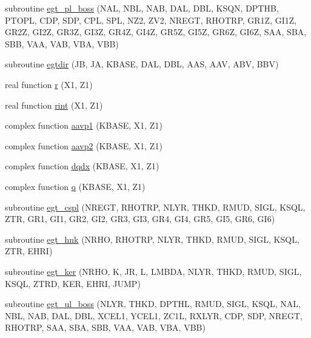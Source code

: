 \begin{DoxyCompactItemize}
\item 
subroutine \hyperlink{Leroi__c_8f90_a7acbe12b71ec5be34d994fc6743480c8}{egt\+\_\+pl\+\_\+boss} (N\+AL, N\+BL, N\+AB, D\+AL, D\+BL, K\+S\+QN, D\+P\+T\+HB, P\+T\+O\+PL, C\+DP, S\+DP, C\+PL, S\+PL, N\+Z2, Z\+V2, N\+R\+E\+GT, R\+H\+O\+T\+RP, G\+R1Z, G\+I1Z, G\+R2Z, G\+I2Z, G\+R3Z, G\+I3Z, G\+R4Z, G\+I4Z, G\+R5Z, G\+I5Z, G\+R6Z, G\+I6Z, S\+AA, S\+BA, S\+BB, V\+AA, V\+AB, V\+BA, V\+BB)
\item 
subroutine \hyperlink{Leroi__c_8f90_a24151574c4bb3d7844db88f91d23b589}{egtdir} (JB, JA, K\+B\+A\+SE, D\+AL, D\+BL, A\+AS, A\+AV, A\+BV, B\+BV)
\item 
real function \hyperlink{Leroi__c_8f90_ab86561ed12c5864e44152801ef93c7c8}{r} (X1, Z1)
\item 
real function \hyperlink{Leroi__c_8f90_a175215729f915283d0b8fb5dec72eb0a}{rint} (X1, Z1)
\item 
complex function \hyperlink{Leroi__c_8f90_a2d69cada9a1fff81caa02d919be5ce7c}{aavp1} (K\+B\+A\+SE, X1, Z1)
\item 
complex function \hyperlink{Leroi__c_8f90_afeabf8ee47c9628f00ed2dfa98f56e40}{aavp2} (K\+B\+A\+SE, X1, Z1)
\item 
complex function \hyperlink{Leroi__c_8f90_a0dd58336077baa8c233cc4d08cc10939}{dqdx} (K\+B\+A\+SE, X1, Z1)
\item 
complex function \hyperlink{Leroi__c_8f90_a3849611a53bff318a7443ebea8b8b480}{q} (K\+B\+A\+SE, X1, Z1)
\item 
subroutine \hyperlink{Leroi__c_8f90_a39b25039701be699f724d2a872d3d3f3}{egt\+\_\+cspl} (N\+R\+E\+GT, R\+H\+O\+T\+RP, N\+L\+YR, T\+H\+KD, R\+M\+UD, S\+I\+GL, K\+S\+QL, Z\+TR, G\+R1, G\+I1, G\+R2, G\+I2, G\+R3, G\+I3, G\+R4, G\+I4, G\+R5, G\+I5, G\+R6, G\+I6)
\item 
subroutine \hyperlink{Leroi__c_8f90_ae50e88569c7037d3d431d0b0dd30c795}{egt\+\_\+hnk} (N\+R\+HO, R\+H\+O\+T\+RP, N\+L\+YR, T\+H\+KD, R\+M\+UD, S\+I\+GL, K\+S\+QL, Z\+TR, E\+H\+RI)
\item 
subroutine \hyperlink{Leroi__c_8f90_ad8346887f578fa81508d64ff7308bd70}{egt\+\_\+ker} (N\+R\+HO, K, JR, L, L\+M\+B\+DA, N\+L\+YR, T\+H\+KD, R\+M\+UD, S\+I\+GL, K\+S\+QL, Z\+T\+RD, K\+ER, E\+H\+RI, J\+U\+MP)
\item 
subroutine \hyperlink{Leroi__c_8f90_a9074cfabdfb82294ca3b8541c14a9099}{egt\+\_\+ul\+\_\+boss} (N\+L\+YR, T\+H\+KD, D\+P\+T\+HL, R\+M\+UD, S\+I\+GL, K\+S\+QL, N\+AL, N\+BL, N\+AB, D\+AL, D\+BL, X\+C\+E\+L1, Y\+C\+E\+L1, Z\+C1L, R\+X\+L\+YR, C\+DP, S\+DP, N\+R\+E\+GT, R\+H\+O\+T\+RP, S\+AA, S\+BA, S\+BB, V\+AA, V\+AB, V\+BA, V\+BB)

\end{DoxyCompactItemize}

